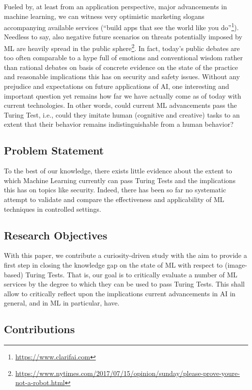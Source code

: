 \documentclass[sigconf,review,anonymous]{acmart}
\begin{document}
Fueled by, at least from an application perspective, major advancements in machine learning, we can witness very optimistic marketing slogans accompanying available services (``build apps that see the world like you do''\footnote{\url{https://www.clarifai.com}}). Needless to say, also negative future scenarios on threats potentially imposed by ML are heavily spread in the public sphere\footnote{\url{https://www.nytimes.com/2017/07/15/opinion/sunday/please-prove-youre-not-a-robot.html}}. In fact, today's public debates are too often comparable to a hype
full of emotions and conventional wisdom rather than rational debates on basis of concrete evidence on the state of the practice and reasonable implications this has on security and safety issues. Without any prejudice and expectations on future applications of AI, one interesting and important question yet remains how far we have actually come as of today with current technologies. In other words, could current ML advancements pass the Turing Test, i.e., could they imitate human (cognitive and creative) tasks to an extent that their behavior remains indistinguishable from a human behavior?

\subsection{Problem Statement}

To the best of our knowledge, there exists little evidence about the extent to which Machine Learning currently can pass Turing Tests and the implications this has on topics like security. Indeed, there has been so far no systematic attempt to validate and compare the effectiveness and applicability of ML techniques in controlled settings. 

\subsection{Research Objectives}

With this paper, we contribute a curiosity-driven study with the aim to provide a first step in closing the knowledge gap on the state of ML with respect to (image-based) Turing Tests. That is, our goal is to critically evaluate a number of ML services by the degree to which they can be used to pass Turing Tests. This shall allow to critically reflect upon the implications current advancements in AI in general, and in ML in particular, have.

\subsection{Contributions}
\end{document}
